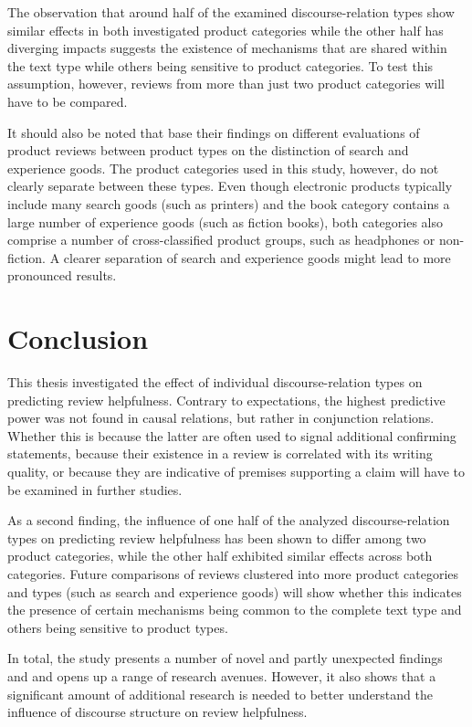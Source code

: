 \documentclass[
    a4paper,%
    12pt,%
    oneside,%
    toc=bibliography,
    final,
]{scrartcl}
\begin{document}
The observation that around half of the examined discourse-relation types show similar effects in both investigated product categories while the other half has diverging impacts suggests the existence of mechanisms that are shared within the text type while others being sensitive to product categories. To test this assumption, however, reviews from more than just two product categories will have to be compared.

It should also be noted that \citet{MudambiSchuff2010} base their findings on different evaluations of product reviews between product types on the distinction of search and experience goods. The product categories used in this study, however, do not clearly separate between these types. Even though electronic products typically include many search goods (such as printers) and the book category contains a large number of experience goods (such as fiction books), both categories also comprise a number of cross-classified product groups, such as headphones or non-fiction. A clearer separation of search and experience goods might lead to more pronounced results.


\section{Conclusion}
\label{sec:conclusion}

This thesis investigated the effect of individual discourse-relation types on predicting review helpfulness. Contrary to expectations, the highest predictive power was not found in causal relations, but rather in conjunction relations. Whether this is because the latter are often used to signal additional confirming statements, because their existence in a review is correlated with its writing quality, or because they are indicative of premises supporting a claim will have to be examined in further studies.

As a second finding, the influence of one half of the analyzed discourse-relation types on predicting review helpfulness has been shown to differ among two product categories, while the other half exhibited similar effects across both categories. Future comparisons of reviews clustered into more product categories and types (such as search and experience goods) will show whether this indicates the presence of certain mechanisms being common to the complete text type and others being sensitive to product types.

In total, the study presents a number of novel and partly unexpected findings and and opens up a range of research avenues. However, it also shows that a significant amount of additional research is needed to better understand the influence of discourse structure on review helpfulness.
\end{document}
